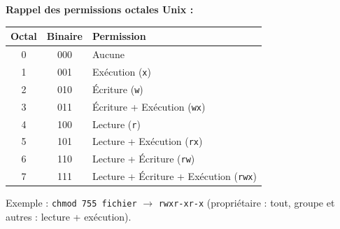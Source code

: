 \documentclass[a4paper,11pt]{article}
\theoremstyle{plain}
\theoremstyle{definition}
\begin{document}
\begin{rappel}
\medskip
\textbf{Rappel des permissions octales Unix :}
\begin{center}
\begin{tabular}{ccl}
\toprule
\textbf{Octal} & \textbf{Binaire} & \textbf{Permission} \\
\midrule
0 & 000 & Aucune \\
1 & 001 & Exécution (\texttt{x}) \\
2 & 010 & Écriture (\texttt{w}) \\
3 & 011 & Écriture + Exécution (\texttt{wx}) \\
4 & 100 & Lecture (\texttt{r}) \\
5 & 101 & Lecture + Exécution (\texttt{rx}) \\
6 & 110 & Lecture + Écriture (\texttt{rw}) \\
7 & 111 & Lecture + Écriture + Exécution (\texttt{rwx}) \\
\bottomrule
\end{tabular}
\end{center}

Exemple : \texttt{chmod 755 fichier} $\rightarrow$ \texttt{rwxr-xr-x} (propriétaire : tout, groupe et autres : lecture + exécution).
\end{rappel}
\end{document}
